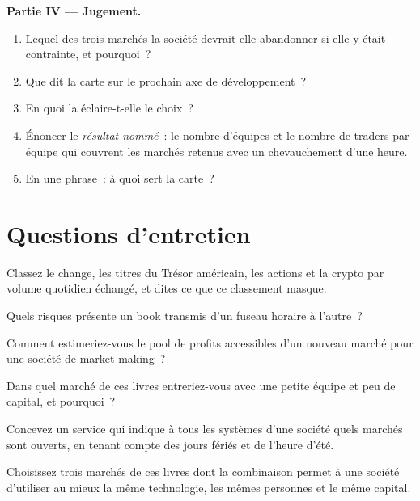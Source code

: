 \begin{problem}
\medskip\noindent\textbf{Partie IV --- Jugement.}
\begin{enumerate}[resume]
\item Lequel des trois marchés la société devrait-elle abandonner si elle y était contrainte, et pourquoi~?
\item Que dit la carte sur le prochain axe de développement~?
\item En quoi la  éclaire-t-elle le choix~?
\item Énoncer le \emph{résultat nommé}~: le nombre d'équipes et le nombre de traders par équipe qui couvrent les marchés retenus avec un chevauchement d'une heure.
\item En une phrase~: à quoi sert la carte~?
\end{enumerate}
\end{problem}

\section{Questions d'entretien}

\begin{interviewq}\label{iq:m3:a-map-of-all-markets:1}
Classez le change, les titres du Trésor américain, les actions et la crypto par volume quotidien échangé, et dites ce que ce classement masque.
\end{interviewq}

\begin{interviewq}\label{iq:m3:a-map-of-all-markets:2}
Quels risques présente un book transmis d'un fuseau horaire à l'autre~?
\end{interviewq}

\begin{interviewq}\label{iq:m3:a-map-of-all-markets:3}
Comment estimeriez-vous le pool de profits accessibles d'un nouveau marché pour une société de market making~?
\end{interviewq}

\begin{interviewq}\label{iq:m3:a-map-of-all-markets:4}
Dans quel marché de ces livres entreriez-vous avec une petite équipe et peu de capital, et pourquoi~?
\end{interviewq}

\begin{interviewq}\label{iq:m3:a-map-of-all-markets:5}
Concevez un service qui indique à tous les systèmes d'une société quels marchés sont ouverts, en tenant compte des jours fériés et de l'heure d'été.
\end{interviewq}

\begin{interviewq}\label{iq:m3:a-map-of-all-markets:6}
Choisissez trois marchés de ces livres dont la combinaison permet à une société d'utiliser au mieux la même technologie, les mêmes personnes et le même capital.
\end{interviewq}
